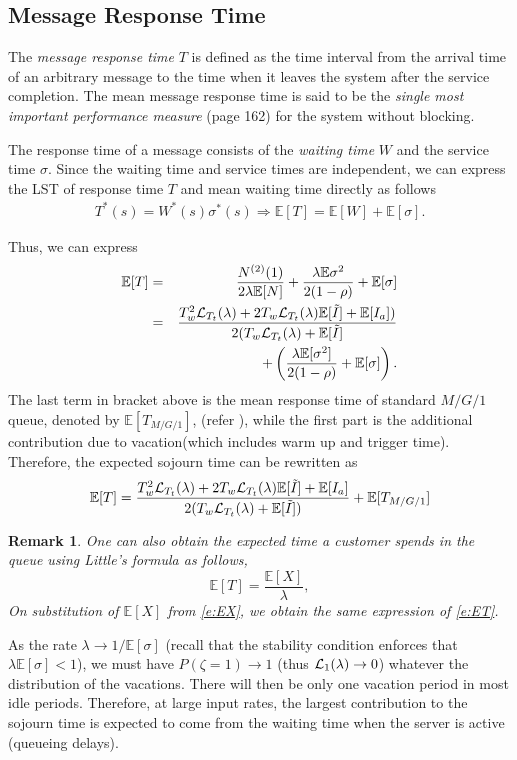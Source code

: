\documentclass[journal]{IEEEtran}
\newcommand {\beq} {\begin{equation}}
\newcommand {\eeq} {\end{equation}}
\newcommand {\bear} {\begin{eqnarray}}
\newcommand {\eear} {\end{eqnarray}}
\def \E{{\mathbb E}}
\newtheorem{remark}{Remark}
\begin{document}
\subsection{Message Response Time}
The {\em message response time} $T$ is defined as the time interval from the arrival time of an arbitrary message to the time when it leaves the system after the service completion. The mean message response time is said to be the \emph{single most important performance measure} \cite{Kleinrock}(page 162) for the system without blocking.

The response time of a message consists of the { \em waiting time} $W$ and the service time $\sigma$. Since the waiting time and service times are independent, we can express the LST of response time $T$ and mean waiting time directly as follows
\bear
T^*(s)=W^*(s)\sigma^*(s) \Rightarrow \E[T]=\E[W]+\E[\sigma].
\eear

Thus, we can express
\bear
\nonumber
\E[T]&=& \frac{{N^{(2)}}(1)}{2\lambda \E[N]}+\frac{\lambda \E{\sigma^2}}{2(1-\rho)}+\E[\sigma]\\
&=&\label{e:T-alt}\frac{T_w^2{\cal L}_{T_t}(\lambda)+2T_w{\cal L}_{T_t}(\lambda)\E[\tilde{I}]+\E[I_a])}{2(T_w{\cal L}_{T_t}(\lambda)+\E[\tilde{I}]}\nonumber \\
&&+\left(\frac{\lambda \E[\sigma^2]}{2(1-\rho)}+\E[\sigma]\right).
\eear
The last term in bracket above is the mean response time of standard $M/G/1$ queue, denoted by $\E[T_{M/G/1}]$, (refer \cite{Takagi}), while the first part is the additional contribution due to vacation(which includes warm up and trigger time). Therefore, the expected sojourn time can be rewritten as
\bear
\label{e:ET}
\E[T]=\frac{T_w^2{\cal L}_{T_t}(\lambda)+2T_w{\cal L}_{T_t}(\lambda)\E[\tilde{I}]+\E[I_a]}{2(T_w{\cal L}_{T_t}(\lambda)+\E[\tilde{I}])}+\E[T_{M/G/1}]
\eear
\begin{remark}
One can also obtain the expected time a customer spends in the queue using Little's formula as follows,
\beq
\label{e:T}
\E[T]=\frac{\E[X]}{\lambda},
\eeq
On substitution of $\E[X]$ from \eqref{e:EX}, we obtain the same expression of \eqref{e:ET}.
\end{remark}

As the rate $\lambda\to1/\E[\sigma]$ (recall that the stability condition enforces that $\lambda\E[\sigma]<1$), we must have $P(\zeta=1)\to1$ (thus ${\cal L}_1(\lambda)\to0$) whatever the distribution of the vacations. There will then be only one vacation period in most idle periods. Therefore, at large input rates, the largest contribution to the sojourn time is expected to come from the waiting time when the server is active (queueing delays).
\end{document}
